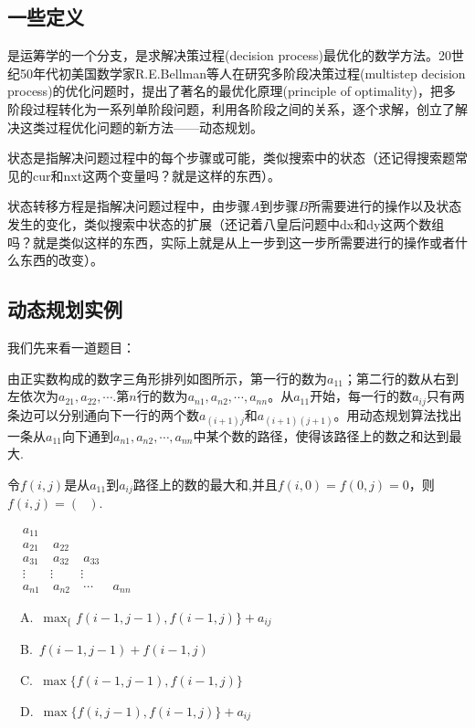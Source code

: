 \subsection{一些定义}
\begin{definition}是运筹学的一个分支，是求解决策过程(decision process)最优化的数学方法。20世纪50年代初美国数学家R.E.Bellman等人在研究多阶段决策过程(multistep decision process)的优化问题时，提出了著名的最优化原理(principle of optimality)，把多阶段过程转化为一系列单阶段问题，利用各阶段之间的关系，逐个求解，创立了解决这类过程优化问题的新方法——动态规划。
\end{definition}
\begin{definition}[状态]
	状态是指解决问题过程中的每个步骤或可能，类似搜索中的状态（还记得搜索题常见的cur和nxt这两个变量吗？就是这样的东西）。
\end{definition}
\begin{definition}[状态转移方程]
	状态转移方程是指解决问题过程中，由步骤$A$到步骤$B$所需要进行的操作以及状态发生的变化，类似搜索中状态的扩展（还记着八皇后问题中dx和dy这两个数组吗？就是类似这样的东西，实际上就是从上一步到这一步所需要进行的操作或者什么东西的改变）。
\end{definition}

\subsection{动态规划实例}
我们先来看一道题目：

\begin{example}由正实数构成的数字三角形排列如图所示，第一行的数为$a_{11}$；第二行的数从右到左依次为$a_{21},a_{22},\cdots$.第$n$行的数为$a_{n1},a_{n2},\cdots,a_{nn}$。从$a_{11}$开始，每一行的数$a_{ij}$只有两条边可以分别通向下一行的两个数$a_{(i+1)j}$和$a_{(i+1)(j+1)}$。用动态规划算法找出一条从$a_{11}$向下通到$a_{n1},a_{n2},\cdots,a_{nn}$中某个数的路径，使得该路径上的数之和达到最大.

	令$f(i,j)$是从$a_{11}$到$a_{ij}$路径上的数的最大和,并且$f(i,0)=f(0,j)=0$，则$f(i,j)=(\ \ \ )$.
	\begin{center}
		\begin{math}
			\begin{matrix}
				&a_{11}&         \\
				&a_{21}&\ a_{22}         \\
				&a_{31}&\ a_{32}&\ a_{33} \\
				&\vdots&\vdots&\vdots&       \\
				&a_{n1}&\ a_{n2}&\ \cdots&\ a_{nn}
			\end{matrix}
		\end{math}
	\end{center}

	\ \ A.\ $\max_\{f(i-1,j-1),f(i-1,j)\}+a_{ij}$

	\ \ B.\ $f(i-1,j-1)+f(i-1,j)$

	\ \ C.\ $\max\{f(i-1,j-1),f(i-1,j)\}$

	\ \ D.\ $\max\{f(i,j-1),f(i-1,j)\}+a_{ij}$
\end{example}

